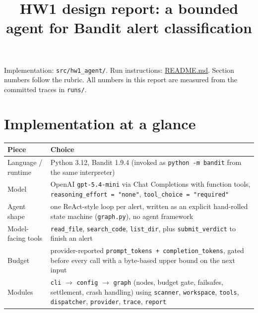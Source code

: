 \documentclass[
  10pt,
]{article}
\title{HW1 design report: a bounded agent for Bandit alert
classification}
\author{}
\date{}
\newcounter{none} %
\begin{document}
\maketitle

Implementation: \texttt{src/hw1\_agent/}. Run instructions:
\url{README.md}. Section numbers follow the rubric. All numbers in this
report are measured from the committed traces in \texttt{runs/}.

\section{Implementation at a glance}\label{implementation-at-a-glance}

{\def\LTcaptype{none} %
\begin{longtable}[]{@{}
  >{\raggedright\arraybackslash}p{}
  >{\raggedright\arraybackslash}p{}@{}}
\toprule\noalign{}
\begin{minipage}[b]{\linewidth}\raggedright
Piece
\end{minipage} & \begin{minipage}[b]{\linewidth}\raggedright
Choice
\end{minipage} \\
\midrule\noalign{}
\endhead
\bottomrule\noalign{}
\endlastfoot
Language / runtime & Python 3.12, Bandit 1.9.4 (invoked as
\texttt{python\ -m\ bandit} from the same interpreter) \\
Model & OpenAI \texttt{gpt-5.4-mini} via Chat Completions with function
tools, \texttt{reasoning\_effort\ =\ "none"},
\texttt{tool\_choice\ =\ "required"} \\
Agent shape & one ReAct-style loop per alert, written as an explicit
hand-rolled state machine (\texttt{graph.py}), no agent framework \\
Model-facing tools & \texttt{read\_file}, \texttt{search\_code},
\texttt{list\_dir}, plus \texttt{submit\_verdict} to finish an alert \\
Budget & provider-reported
\texttt{prompt\_tokens\ +\ completion\_tokens}, gated before every call
with a byte-based upper bound on the next input \\
Modules & \texttt{cli} \ensuremath{\rightarrow} \texttt{config} \ensuremath{\rightarrow} \texttt{graph} (nodes, budget
gate, failsafes, settlement, crash handling) using \texttt{scanner},
\texttt{workspace}, \texttt{tools}, \texttt{dispatcher},
\texttt{provider}, \texttt{trace}, \texttt{report} \\
\end{longtable}
}
\end{document}
